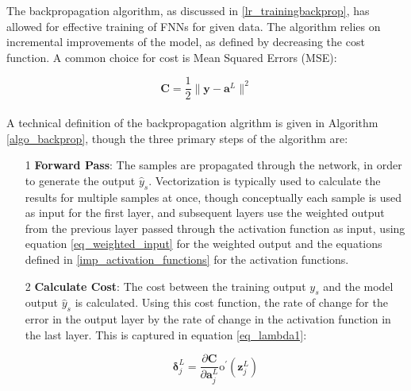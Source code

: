 \documentclass[a4paper,11pt,oneside]{article}
\theoremstyle{plain}
\theoremstyle{definition}
\begin{document}
The backpropagation algorithm, as discussed in \ref{lr_trainingbackprop}, has allowed for effective training of FNNs for given data. The algorithm relies on incremental improvements of the model, as defined by decreasing the cost function. A common choice for cost is Mean Squared Errors (MSE):

\begin{equation}\label{func_MSE}
\mathbf{C} = \frac{1}{2} \rVert \mathbf{y} - \mathbf{a}^L \rVert^2
\end{equation}
~\\

A technical definition of the backpropagation algrithm is given in Algorithm \ref{algo_backprop}, though the three primary steps of the algorithm are:\newline
\begin{itemize}
	\item [1] \textbf{Forward Pass}: The samples are propagated through the network, in order to generate the output $\hat{y}_s$. Vectorization is typically used to calculate the results for multiple samples at once, though conceptually each sample is used as input for the first layer, and subsequent layers use the weighted output from the previous layer passed through the activation function as input, using equation \eqref{eq_weighted_input} for the weighted output and the equations defined in \ref{imp_activation_functions} for the activation functions.
	\newline
	\item [2] \textbf{Calculate Cost}: The cost between the training output $y_s$ and the model output $\hat{y}_s$ is calculated. Using this cost function, the rate of change for the error in the output layer by the rate of change in the activation function in the last layer. This is captured in equation \eqref{eq_lambda1}:	
	
		\begin{equation}\label{eq_lambda1}
		\mathbf{\delta}_{j}^{L}=\frac{\partial \mathbf{C}}{\partial \mathbf{a}_{j}^{L}} \mathrm{o}^{\prime}\left(\mathbf{z}_{j}^{L}\right)
		\end{equation}
		

\end{itemize}
\end{document}
